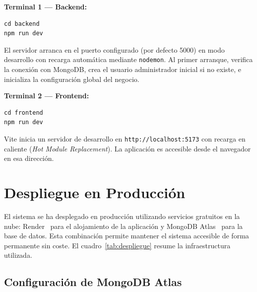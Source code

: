 \textbf{Terminal 1 --- Backend:}
\begin{verbatim}
cd backend
npm run dev
\end{verbatim}

El servidor arranca en el puerto configurado (por defecto 5000) en modo desarrollo con recarga autom\'atica mediante \texttt{nodemon}. Al primer arranque, verifica la conexi\'on con MongoDB, crea el usuario administrador inicial si no existe, e inicializa la configuraci\'on global del negocio.

\textbf{Terminal 2 --- Frontend:}
\begin{verbatim}
cd frontend
npm run dev
\end{verbatim}

Vite inicia un servidor de desarrollo en \texttt{http://localhost:5173} con recarga en caliente (\textit{Hot Module Replacement}). La aplicaci\'on es accesible desde el navegador en esa direcci\'on.

\section{Despliegue en Producci\'on}\label{sec:produccion}

El sistema se ha desplegado en producci\'on utilizando servicios gratuitos en la nube: Render~\cite{render_docs} para el alojamiento de la aplicaci\'on y MongoDB Atlas~\cite{atlas_docs} para la base de datos. Esta combinaci\'on permite mantener el sistema accesible de forma permanente sin coste. El cuadro~\ref{tab:despliegue} resume la infraestructura utilizada.


\subsection{Configuraci\'on de MongoDB Atlas}\label{subsec:config-atlas}

